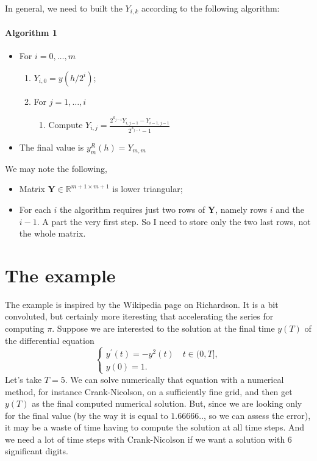 \documentclass[10pt,a4paper,twoside]{article}
\begin{document}
    
In general, we need to built the $Y_{i,k}$ according to  the following algorithm:
\paragraph{Algorithm 1}
\begin{itemize}
    \item For $i=0,\ldots,m$
    \begin{enumerate}
        \item $Y_{i,0}=y(h/2^i)$;
        \item For $j=1,\ldots,i$
        \begin{enumerate}
            \item Compute $Y_{i,j}=\frac{2^{k_{j-1}}Y_{i,j-1}-Y_{i-1,j-1}}{2^{k_{j-1}}-1}$
        \end{enumerate}
    \end{enumerate}
\item The final value is $y^R_m(h)=Y_{m,m}$
\end{itemize}
     
We may note the following, 
\begin{itemize}
    \item Matrix $\mathbf{Y}\in\mathbb{R}^{m+1\times m+1}$ is lower triangular;
    \item For each $i$ the algorithm requires just two rows of $\mathbf{Y}$, namely rows $i$ and the $i-1$. A part the very first step. So I need to store only the two last rows, not the whole matrix.
\end{itemize}  
\section{The example}
The example is inspired by the Wikipedia page on Richardson. It is a bit convoluted, but certainly more iteresting that accelerating the series for computing $\pi$. Suppose we are interested to the solution at the final time
$y(T)$ of the differential equation
\begin{equation}
  \begin{cases}
    y^\prime(t)=-y^2(t)\quad t\in (0,T],\\
    y(0)=1.
  \end{cases}
\end{equation}
Let's take $T=5$. We can solve numerically that equation with a numerical method, for instance Crank-Nicolson, on a sufficiently fine grid, and then get
$y(T)$ as the final computed numerical solution. But, since we are looking only for the final value (by the way it is equal to $1.66666..$, so we can assess the error), it may be a waste of time having to compute the solution at all time steps. And we need a lot of time steps with Crank-Nicolson if we want a solution with 6 significant digits.
\end{document}
